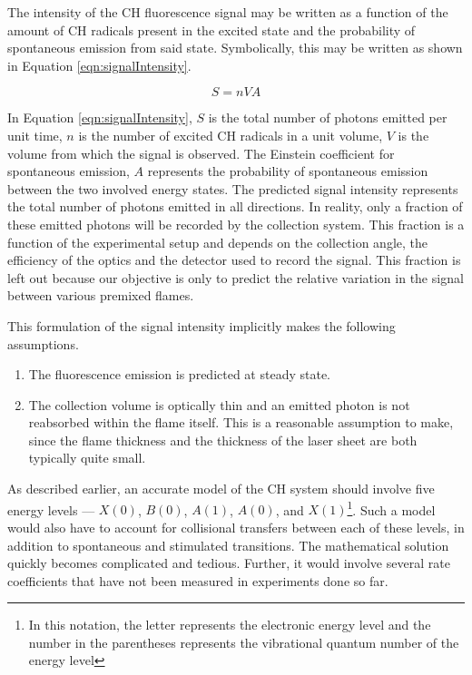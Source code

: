 The intensity of the CH fluorescence signal may be written as a function of the amount of CH radicals present in the excited state and the probability of spontaneous emission from said state.
Symbolically, this may be written as shown in Equation \ref{eqn:signalIntensity}.

\begin{equation}
S=nVA
\label{eqn:signalIntensity}
\end{equation}

In Equation \ref{eqn:signalIntensity}, \(S\) is the total number of photons emitted per unit time, \(n\) is the number of excited CH radicals in a unit volume, \(V\) is the volume from which the signal is observed.
The Einstein coefficient for spontaneous emission, \(A\) represents the probability of spontaneous emission between the two involved energy states.
The predicted signal intensity represents the total number of photons emitted in all directions.
In reality, only a fraction of these emitted photons will be recorded by the collection system.
This fraction is a function of the experimental setup and depends on the collection angle, the efficiency of the optics and the detector used to record the signal.
This fraction is left out because our objective is only to predict the relative variation in the signal between various premixed flames.

This formulation of the signal intensity implicitly makes the following assumptions.
\begin{enumerate}
\item The fluorescence emission is predicted at steady state.
\item The collection volume is optically thin and an emitted photon is not reabsorbed within the flame itself.
This is a reasonable assumption to make, since the flame thickness and the thickness of the laser sheet are both typically quite small.
\end{enumerate}

As described earlier, an accurate model of the CH system should involve five energy levels --- \(X(0)\), \(B(0)\), \(A(1)\), \(A(0)\), and \(X(1)\)\footnote{In this notation, the letter represents the electronic energy level and the number in the parentheses represents the vibrational quantum number of the energy level}.
Such a model would also have to account for collisional transfers between each of these levels, in addition to spontaneous and stimulated transitions.
The mathematical solution quickly becomes complicated and tedious.
Further, it would involve several rate coefficients that have not been measured in experiments done so far.

